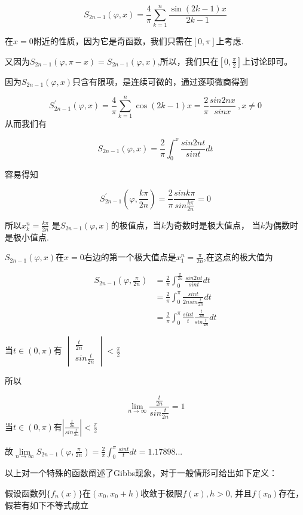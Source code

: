 \documentclass{lzureport}
\begin{document}
$$S_{2n-1}(\varphi,x)=\frac{4}{\pi}\sum_{k=1}^{n}\frac{\sin{(2k-1)x}}{2k-1}$$

在$x=0$附近的性质，因为它是奇函数，我们只需在$[0,\pi]$上考虑.

又因为$S_{2n-1}(\varphi,\pi-x)=S_{2n-1}(\varphi,x)$,所以，我们只在$[0,\frac\pi2]$上讨论即可。

因为$S_{2n-1}(\varphi,x)$只含有限项，是连续可微的，通过逐项微商得到

$$
S_{2n-1}^{\prime}(\varphi,x)=\frac{4}{\pi}\sum_{k=1}^{n}\cos{(2k-1)x}=\frac{2}{\pi}\frac{sin2nx}{sinx}\:,x\neq0
$$
 从而我们有

$$
S_{2n-1}(\varphi,x)={\frac{2}{\pi}}\int_{0}^{x}{\frac{sin2nt}{sint}}dt
$$

容易得知

$$
S_{2n-1}^{\prime}\left(\varphi,\frac{k\pi}{2n}\right)=\frac{2}{\pi}\frac{sink\pi}{sin\frac{k\pi}{2n}}=0
$$

所以$x_k^n=\frac{k\pi}{2n}$ 是$S_{2n-1}(\varphi,x)$的极值点，当$k$为奇数时是极大值点， 当$k$为偶数时是极小值点.

$S_{2n-1}(\varphi,x)$在$x=0$右边的第一个极大值点是$x_1^n=\frac\pi{2n}$,在这点的极大值为

$$
\begin{aligned}
	S_{2n-1}\left(\varphi,{\frac{\pi}{2n}}\right)&={\frac{2}{\pi}}\int_{0}^{\frac{\pi}{2n}}{\frac{sin2nt}{sint}}dt \\
	&=\frac{2}{\pi}\int_{0}^{\pi}\frac{sint}{2nsin\frac{t}{2n}}dt\\
	&=\frac{2}{\pi}\int_{0}^{\pi}\frac{sint}{t}\frac{\frac{t}{2n}}{sin\frac{t}{2n}}dt 
\end{aligned}
$$

当$t\in(0, \pi)$有 $\begin{vmatrix}\frac{t}{2n}\\\hline sin\frac{t}{2n}\end{vmatrix}<\frac{\pi}{2}$

所以

$$
\lim_{n\to\infty}\frac{\frac{t}{2n}}{sin\frac{t}{2n}}=1
$$
当$t\in(0, \pi)$有$|\frac{\frac{t}{2n}}{sin\frac{t}{2n}}|<\frac{\pi}{2}$

故$\lim\limits_{n\to\infty}S_{2n-1}\left(\varphi,\frac{\pi}{2n}\right)=\frac{2}{\pi}\int_{0}^{\pi}\frac{sint}{t}dt=1.17898...$

以上对一个特殊的函数阐述了Gibbs现象，对于一般情形可给出如下定义：

假设函数列$\{f_n(x)\}$在$(x_0,x_0+h)$收敛于极限$f(x),h>0$,  并且$f(x_{0})$存在，假若有如下不等式成立
\end{document}
